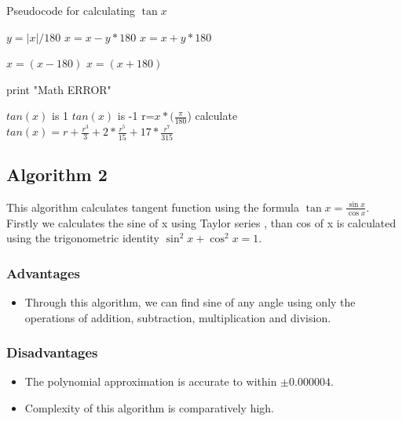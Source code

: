 \documentclass{article}
\begin{document}
\begin{algorithm}
\caption{ Pseudocode for calculating $\tan x$}

\begin{algorithmic}[1]

  \State $y=|x|/180$
  \State $x=x-y*180 $ 
\EndIf
{}
 \State $x=x+y*180 $ 
\EndIf

\EndIf  {}

  \State $x=(x-180)$
\EndIf
{}
 \State $x=(x+180)$
 \EndIf
\EndIf  {}

  \State print "Math ERROR"
  
 \State \(tan(x)\) is 1
  \State \(tan(x)\) is -1
 \Else
    \State r=\(x*(\frac{\pi}{180}\)) 
    \State calculate  \( tan(x)=r+\frac{r^3}{3}+2*\frac{r^5}{15}+17*\frac{r^7}{315}\)
  
\EndIf
 

  

 \EndProcedure \end{algorithmic} 
\end{algorithm}



\pagebreak

\subsection{Algorithm 2}
This algorithm calculates tangent function using the formula \( \tan x =  \frac{\sin x}{\cos x}\). Firstly we calculates the sine of x using Taylor series , than cos of x is calculated using the trigonometric identity \(\sin^2x + \cos^2x = 1\).
\subsubsection{Advantages}
\begin{itemize}
    
    \item Through this algorithm, we can find sine of any angle using only the operations of addition, subtraction, multiplication and division. 
\end{itemize}
\subsubsection{Disadvantages}
\begin{itemize}
    \item The  polynomial approximation is accurate to within \(\pm0.000004\).
   \item Complexity of this algorithm is comparatively high.
   
\end{itemize}
\end{document}

